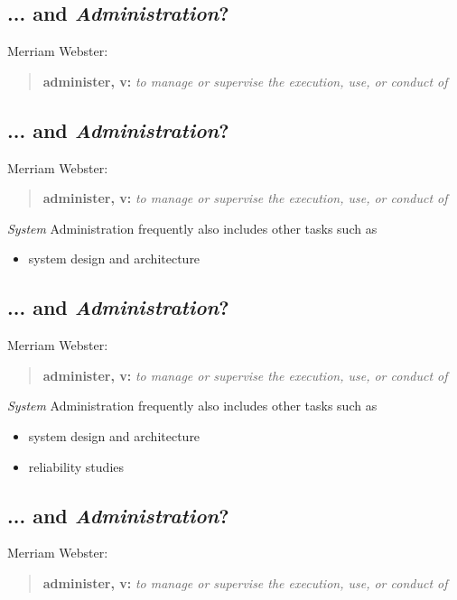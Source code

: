 \documentclass[xga]{xdvislides}
\begin{document}
\subsection{... and {\em Administration}?}
Merriam Webster:
\begin{quote}
	{\bf administer, v:} {\em to manage or supervise the execution, use, or conduct of} \\
\end{quote}


\subsection{... and {\em Administration}?}
Merriam Webster:
\begin{quote}
	{\bf administer, v:} {\em to manage or supervise the execution, use, or conduct of} \\
\end{quote}

{\em System} Administration frequently also includes other tasks such as
\begin{itemize}
	\item system design and architecture
\end{itemize}

\subsection{... and {\em Administration}?}
Merriam Webster:
\begin{quote}
	{\bf administer, v:} {\em to manage or supervise the execution, use, or conduct of} \\
\end{quote}

{\em System} Administration frequently also includes other tasks such as
\begin{itemize}
	\item system design and architecture
	\item reliability studies
\end{itemize}

\subsection{... and {\em Administration}?}
Merriam Webster:
\begin{quote}
	{\bf administer, v:} {\em to manage or supervise the execution, use, or conduct of} \\
\end{quote}
\end{document}
